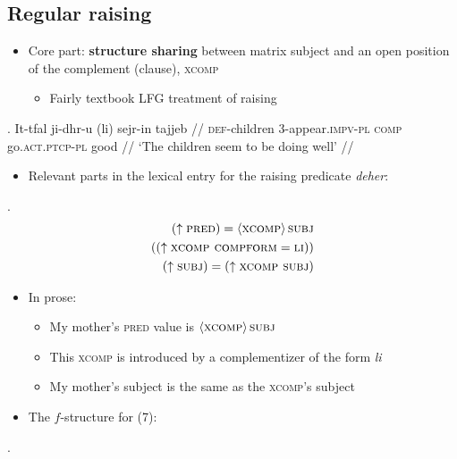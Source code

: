 \documentclass[11pt]{article}
\begin{document}
\subsection{Regular raising}
\begin{itemize}
\item Core part: \textbf{structure sharing} between matrix subject and an open position of the complement (clause), \textsc{xcomp} \begin{itemize}
    \item Fairly textbook LFG treatment of raising
    \end{itemize}
\end{itemize}

\ex. \begingl
  \gla It-tfal ji-dhr-u (li) sejr-in tajjeb //
  \glb \textsc{def}-children 3-appear.\textsc{impv-pl} \textsc{comp} go.\textsc{act.ptcp-pl} good //
  \glft `The children seem to be doing well' //
\endgl

\begin{itemize}
\item Relevant parts in the lexical entry for the raising predicate \emph{deher}:
\end{itemize}

\ex.  \begin{align*}
  (\uparrow \textsc{pred}) = \left\langle \textsc{xcomp} \right\rangle \textsc{subj} \\
  ((\uparrow \textsc{xcomp compform} = \textsc{li})) \\
  (\uparrow \textsc{subj}) = (\uparrow \textsc{xcomp subj}) \\
\end{align*}

\begin{itemize}
\item In prose: \begin{itemize}
    \item My mother's \textsc{pred} value is $\left\langle \textsc{xcomp} \right\rangle \textsc{subj}$
    \item This \textsc{xcomp} is introduced by a complementizer of the form \textit{li}
    \item My mother's subject is the same as the \textsc{xcomp}'s subject
    \end{itemize}

\item The \(f\)-structure for (7):
\end{itemize}
\ex. 
\end{document}
